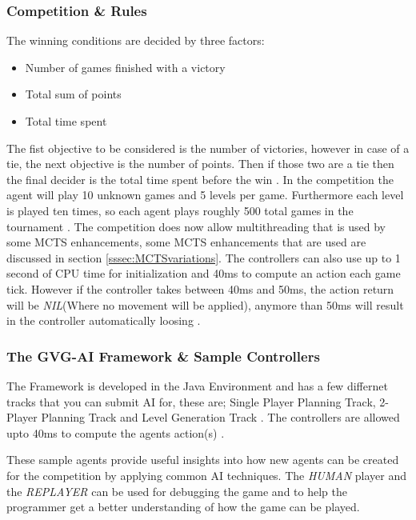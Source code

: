 \documentclass[journal]{IEEEtran}
\begin{document}
		

	\subsubsection{Competition \& Rules}
	
		The winning conditions are decided by three factors:
		\begin{itemize}
		    \item Number of games finished with a victory
		    \item Total sum of points
		    \item Total time spent
		\end{itemize}
		The fist objective to be considered is the number of victories, however in case of a tie, the next objective is the number of points. Then if those two are a tie then the final decider is the total time spent before the win \cite{perez20162014}.
		In the competition the agent will play 10 unknown games and 5 levels per game. Furthermore each level is played ten times, so each agent plays roughly 500 total games in the tournament \cite{schuster2015mcts}.
		The competition does now allow multithreading that is used by some MCTS enhancements, some MCTS enhancements that are used are discussed in section \ref{sssec:MCTSvariations}.
		The controllers can also use up to 1 second of CPU time for initialization and 40ms to compute an action each game tick. However if the controller takes between 40ms and 50ms, the action return will be \textit{NIL}(Where no movement will be applied), anymore than 50ms will result in the controller automatically loosing \cite{horn2016mcts, perez20162014}.
	
	

	\subsubsection{The GVG-AI Framework \& Sample Controllers} \label{Framework}
	
		The Framework is developed in the Java Environment and has a few differnet tracks that you can submit AI for, these are; Single Player Planning Track, 2-Player Planning Track and Level Generation Track \cite{gaina2016general}.
		The controllers are allowed upto 40ms to compute the agents action(s) \cite{perez2016GVGAICompetition, GVGAI}.
		
		
		These sample agents provide useful insights into how new agents can be created for the competition by applying common AI techniques.
		The \textit{HUMAN} player and the \textit{REPLAYER} can be used for debugging the game and to help the programmer get a better understanding of how the game can be played.
		
\end{document}

